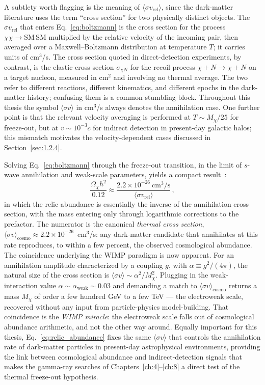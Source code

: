 A subtlety worth flagging is the meaning of $\langle \sigma v_\mathrm{rel}\rangle$, since the dark-matter literature uses the term ``cross section'' for two physically distinct objects.
The $\sigma v_\mathrm{rel}$ that enters Eq.~\eqref{eq:boltzmann} is the cross section for the process $\chi\chi \to \mathrm{SM}\,\mathrm{SM}$ multiplied by the relative velocity of the incoming pair, then averaged over a Maxwell--Boltzmann distribution at temperature $T$; it carries units of cm$^3$/s.
The cross section quoted in direct-detection experiments, by contrast, is the elastic cross section $\sigma_{\chi N}$ for the recoil process $\chi + N \to \chi + N$ on a target nucleon, measured in cm$^2$ and involving no thermal average.
The two refer to different reactions, different kinematics, and different epochs in the dark-matter history; confusing them is a common stumbling block.
Throughout this thesis the symbol $\langle \sigma v\rangle$ in cm$^3$/s always denotes the annihilation case.
One further point is that the relevant velocity averaging is performed at $T \sim M_\chi/25$ for freeze-out, but at $v \sim 10^{-3} c$ for indirect detection in present-day galactic halos; this mismatch motivates the velocity-dependent cases discussed in Section~\ref{sec:1.2.4}.

Solving Eq.~\eqref{eq:boltzmann} through the freeze-out transition, in the limit of $s$-wave annihilation and weak-scale parameters, yields a compact result~\cite{Steigman:2012nb,Cirelli:2024ssz}:
\begin{equation}
	\frac{\Omega_\chi h^2}{0.12} \approx \frac{2.2 \times 10^{-26}~\mathrm{cm^3/s}}{\langle \sigma v_\mathrm{rel}\rangle}\,,
	\label{eq:relic_abundance}
\end{equation}
in which the relic abundance is essentially the inverse of the annihilation cross section, with the mass entering only through logarithmic corrections to the prefactor.
The numerator is the canonical \emph{thermal cross section}, $\langle \sigma v\rangle_\mathrm{cosmo} \approx 2.2 \times 10^{-26}$~cm$^3$/s: any dark-matter candidate that annihilates at this rate reproduces, to within a few percent, the observed cosmological abundance.
The coincidence underlying the WIMP paradigm is now apparent.
For an annihilation amplitude characterized by a coupling $g$, with $\alpha \equiv g^2/(4\pi)$, the natural size of the cross section is $\langle \sigma v\rangle \sim \alpha^2/M_\chi^2$.
Plugging in the weak-interaction value $\alpha \sim \alpha_\mathrm{weak} \sim 0.03$ and demanding a match to $\langle \sigma v\rangle_\mathrm{cosmo}$ returns a mass $M_\chi$ of order a few hundred GeV to a few TeV --- the electroweak scale, recovered without any input from particle-physics model-building.
That coincidence is the \emph{WIMP miracle}: the electroweak scale falls out of cosmological abundance arithmetic, and not the other way around.
Equally important for this thesis, Eq.~\eqref{eq:relic_abundance} fixes the same $\langle \sigma v\rangle$ that controls the annihilation rate of dark-matter particles in present-day astrophysical environments, providing the link between cosmological abundance and indirect-detection signals that makes the gamma-ray searches of Chapters~\ref{ch:4}--\ref{ch:8} a direct test of the thermal freeze-out hypothesis.

